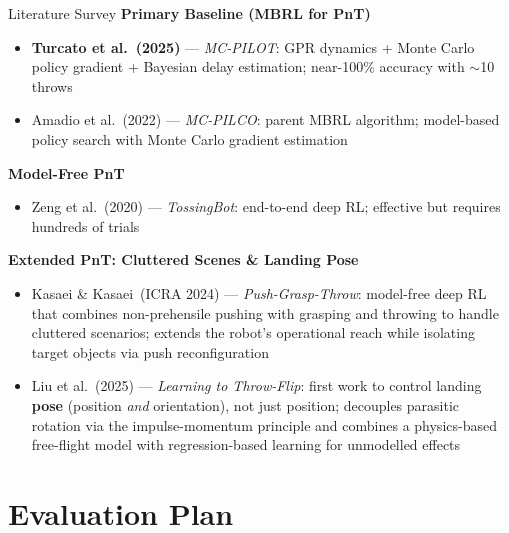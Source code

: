 \documentclass{if-beamer}
\begin{document}
\begin{frame}{Literature Survey}
        \textbf{Primary Baseline (MBRL for PnT)}
        \begin{itemize}
            \item \textbf{Turcato et al.\ (2025)} --- \textit{MC-PILOT}: GPR dynamics + Monte Carlo policy gradient + Bayesian delay estimation; near-100\% accuracy with $\sim$10 throws
            \item Amadio et al.\ (2022) --- \textit{MC-PILCO}: parent MBRL algorithm; model-based policy search with Monte Carlo gradient estimation
        \end{itemize}
        \vspace{0.3em}
        \textbf{Model-Free PnT}
        \begin{itemize}
            \item Zeng et al.\ (2020) --- \textit{TossingBot}: end-to-end deep RL; effective but requires hundreds of trials
        \end{itemize}
        \textbf{Extended PnT: Cluttered Scenes \& Landing Pose}
    \begin{itemize}
        \item Kasaei \& Kasaei\ (ICRA 2024) --- \textit{Push-Grasp-Throw}: model-free deep RL that combines non-prehensile pushing with grasping and throwing to handle cluttered scenarios; extends the robot's operational reach while isolating target objects via push reconfiguration
        \item Liu et al.\ (2025) --- \textit{Learning to Throw-Flip}: first work to control landing \textbf{pose} (position \emph{and} orientation), not just position; decouples parasitic rotation via the impulse-momentum principle and combines a physics-based free-flight model with regression-based learning for unmodelled effects
    \end{itemize}
\end{frame}

\section{Evaluation Plan}
\end{document}
